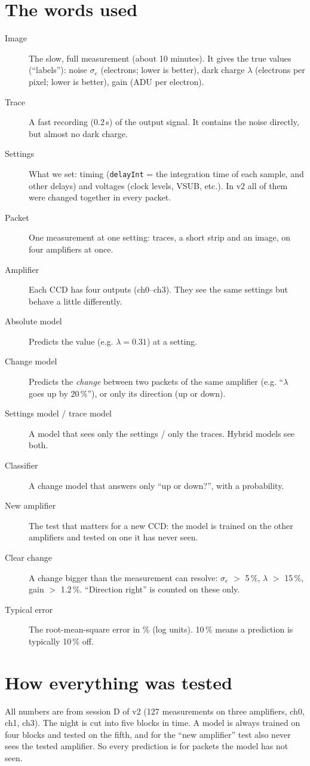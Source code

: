 \documentclass[11pt]{article}
\begin{document}
\section{The words used}
\begin{description}
\item[Image] The slow, full measurement (about 10 minutes). It gives the true values (``labels''): noise $\sigma_e$
  (electrons; lower is better), dark charge $\lambda$ (electrons per pixel; lower is better), gain (ADU per electron).
\item[Trace] A fast recording (0.2\,s) of the output signal. It contains the noise directly, but almost no dark charge.
\item[Settings] What we set: timing (\texttt{delayInt} = the integration time of each sample, and other delays) and
  voltages (clock levels, VSUB, etc.). In v2 all of them were changed together in every packet.
\item[Packet] One measurement at one setting: traces, a short strip and an image, on four amplifiers at once.
\item[Amplifier] Each CCD has four outputs (ch0--ch3). They see the same settings but behave a little differently.
\item[Absolute model] Predicts the value (e.g. $\lambda = 0.31$) at a setting.
\item[Change model] Predicts the \emph{change} between two packets of the same amplifier (e.g. ``$\lambda$ goes up by
  20\,\%''), or only its direction (up or down).
\item[Settings model / trace model] A model that sees only the settings / only the traces. Hybrid models see both.
\item[Classifier] A change model that answers only ``up or down?'', with a probability.
\item[New amplifier] The test that matters for a new CCD: the model is trained on the other amplifiers and tested on
  one it has never seen.
\item[Clear change] A change bigger than the measurement can resolve: $\sigma_e$ $>$ 5\,\%, $\lambda$ $>$ 15\,\%, gain
  $>$ 1.2\,\%. ``Direction right'' is counted on these only.
\item[Typical error] The root-mean-square error in \% (log units). 10\,\% means a prediction is typically 10\,\% off.
\end{description}

\section{How everything was tested}
All numbers are from session D of v2 (127 measurements on three amplifiers, ch0, ch1, ch3). The night is cut into five
blocks in time. A model is always trained on four blocks and tested on the fifth, and for the ``new amplifier'' test
also never sees the tested amplifier. So every prediction is for packets the model has not seen.
\end{document}
